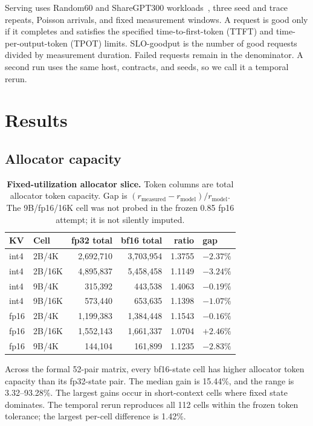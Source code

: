 \documentclass{article}
\begin{document}
Serving uses Random60 and ShareGPT300 workloads~\cite{sharegpt}, three seed and
trace repeats, Poisson arrivals, and fixed measurement windows. A request is
good only if it completes and satisfies the specified time-to-first-token
(TTFT) and time-per-output-token (TPOT) limits. SLO-goodput is the number of
good requests divided by measurement duration. Failed requests remain in the
denominator. A second run uses the same host, contracts, and seeds, so we call
it a temporal rerun.

\section{Results}
\label{sec:results}

\subsection{Allocator capacity}
\label{sec:capacity}

\begin{table}[t]
\centering
\scriptsize
\caption{\textbf{Fixed-utilization allocator slice.} Token columns are total
allocator token capacity. Gap is
$(r_{\mathrm{measured}}-r_{\mathrm{model}})/r_{\mathrm{model}}$. The
9B/fp16/16K cell was not probed in the frozen 0.85 fp16 attempt; it is not
silently imputed.}
\label{tab:capacity}
\setlength{\tabcolsep}{3.1pt}
\begin{tabular}{llrrrl}
\toprule
KV & Cell & fp32 total & bf16 total & ratio & gap\\
\midrule
int4 & 2B/4K  & 2,692,710 & 3,703,954 & 1.3755 & $-2.37\%$\\
int4 & 2B/16K & 4,895,837 & 5,458,458 & 1.1149 & $-3.24\%$\\
int4 & 9B/4K  &   315,392 &   443,538 & 1.4063 & $-0.19\%$\\
int4 & 9B/16K &   573,440 &   653,635 & 1.1398 & $-1.07\%$\\
fp16 & 2B/4K  & 1,199,383 & 1,384,448 & 1.1543 & $-0.16\%$\\
fp16 & 2B/16K & 1,552,143 & 1,661,337 & 1.0704 & $+2.46\%$\\
fp16 & 9B/4K  &   144,104 &   161,899 & 1.1235 & $-2.83\%$\\
\bottomrule
\end{tabular}
\end{table}

Across the formal 52-pair matrix, every bf16-state cell has higher allocator
token capacity than its fp32-state pair. The median gain is 15.44\%, and the
range is 3.32--93.28\%. The largest gains occur in short-context cells where
fixed state dominates. The temporal rerun reproduces all 112 cells within the
frozen token tolerance; the largest per-cell difference is 1.42\%.
\end{document}
